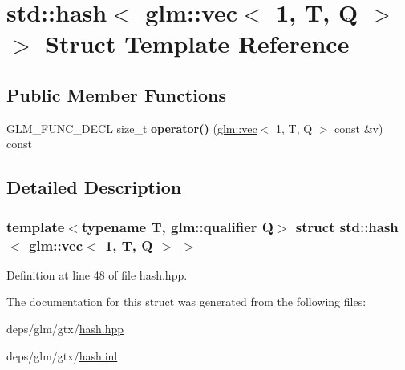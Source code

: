 \hypertarget{structstd_1_1hash_3_01glm_1_1vec_3_011_00_01T_00_01Q_01_4_01_4}{}\section{std\+:\+:hash$<$ glm\+:\+:vec$<$ 1, T, Q $>$ $>$ Struct Template Reference}
\label{structstd_1_1hash_3_01glm_1_1vec_3_011_00_01T_00_01Q_01_4_01_4}
\subsection*{Public Member Functions}
\begin{DoxyCompactItemize}
\item 
\mbox{\label{structstd_1_1hash_3_01glm_1_1vec_3_011_00_01T_00_01Q_01_4_01_4_addb078bc610fddef2cd743762286f20e}} 
G\+L\+M\+\_\+\+F\+U\+N\+C\+\_\+\+D\+E\+CL size\+\_\+t {\bfseries operator()} (\hyperlink{structglm_1_1vec}{glm\+::vec}$<$ 1, T, Q $>$ const \&v) const
\end{DoxyCompactItemize}


\subsection{Detailed Description}
\subsubsection*{template$<$typename T, glm\+::qualifier Q$>$\newline
struct std\+::hash$<$ glm\+::vec$<$ 1, T, Q $>$ $>$}



Definition at line 48 of file hash.\+hpp.



The documentation for this struct was generated from the following files\+:\begin{DoxyCompactItemize}
\item 
deps/glm/gtx/\hyperlink{hash_8hpp}{hash.\+hpp}\item 
deps/glm/gtx/\hyperlink{hash_8inl}{hash.\+inl}\end{DoxyCompactItemize}
